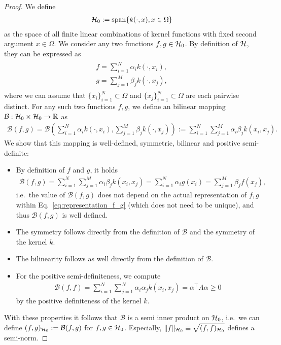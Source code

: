 \begin{proof}
We define
\begin{align*}
\mathcal{H}_0 := \mathrm{span} \{ k(\cdot, x), x \in \Omega \}
\end{align*}
as the space of all finite linear combinations of kernel functions with fixed second argument $x \in \Omega$.
We consider any two functions $f, g \in \mathcal{H}_0$.
By definition of $\mathcal{H}$, they can be expressed as
\begin{align}
\label{eq:representation_f_g}
\begin{aligned}
f = \sum_{i=1}^N \alpha_i k(\cdot, x_i), \\
g = \sum_{j=1}^M \beta_j k(\cdot, x_j),
\end{aligned}
\end{align}
where we can assume that $\{x_i\}_{i=1}^N \subset \Omega$ and $\{x_j\}_{i=1}^N \subset \Omega$ are each pairwise distinct.
For any such two functions $f, g$, 
we define an bilinear mapping $\mathcal{B}: \mathcal{H}_0 \times \mathcal{H}_0 \rightarrow \mathbb{R}$ as 
\begin{align*}
\mathcal{B}(f, g) = \mathcal{B} \left( \sum_{i=1}^N \alpha_i k(\cdot, x_i), \sum_{j=1}^M \beta_j k(\cdot, x_j) \right ) 
:= \sum_{i=1}^N \sum_{j=1}^M \alpha_i \beta_j k(x_i, x_j).
\end{align*}
We show that this mapping is well-defined, symmetric, bilinear and positive semi-definite:
\begin{itemize}
\item By definition of $f$ and $g$, it holds
\begin{align*}
\mathcal{B}(f, g) = \sum_{i=1}^N \sum_{j=1}^M \alpha_i \beta_j k(x_i, x_j) = \sum_{i=1}^N \alpha_i g(x_i) = \sum_{j=1}^M \beta_j f(x_j),
\end{align*}
i.e.\ the value of $\mathcal{B}(f, g)$ does not depend on the actual representation of $f, g$ within Eq.~\eqref{eq:representation_f_g} (which does not need to be unique),
and thus $\mathcal{B}(f, g)$ is well defined.
\item The symmetry follows directly from the definition of $\mathcal{B}$ and the symmetry of the kernel $k$.
\item The bilinearity follows as well directly from the definition of $\mathcal{B}$.
\item For the positive semi-definiteness, we compute
\begin{align*}
\mathcal{B}(f, f) = \sum_{i=1}^N \sum_{j=1}^N \alpha_i \alpha_j k(x_i, x_j) = \alpha^\top A \alpha \geq 0
\end{align*}
by the positive definiteness of the kernel $k$.
\end{itemize}
With these properties it follows that $\mathcal{B}$ is a semi inner product on $\mathcal{H}_0$, 
i.e.\ we can define $(f, g)_{\mathcal{H}_0} := \mathcal{B}(f, g)$ for $f, g \in \mathcal{H}_0$.
Especially, $\Vert f \Vert_{\mathcal{H}_0} \equiv \sqrt{(f, f)_{\mathcal{H}_0}}$ defines a semi-norm.


\end{proof}
